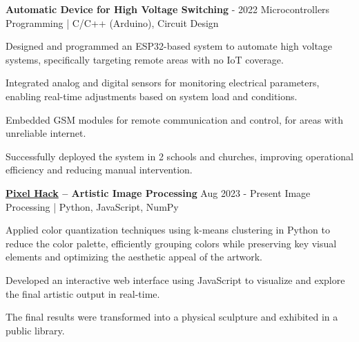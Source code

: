 \begin{rSection}
    \begin{rSubsection}
        {\bf Automatic Device for High Voltage Switching}
        { - 2022}
        {Microcontrollers Programming {\normalfont \small \ttfamily | C/C++ (Arduino), Circuit Design} }
        {}
        \item Designed and programmed an ESP32-based system to automate high voltage systems, specifically targeting remote areas with no IoT coverage.
        \item Integrated analog and digital sensors for monitoring electrical parameters, enabling real-time adjustments based on system load and conditions.
        \item Embedded GSM modules for remote communication and control, for areas with unreliable internet.
        \item Successfully deployed the system in 2 schools and churches, improving operational efficiency and reducing manual intervention.
    \end{rSubsection}


    \begin{rSubsection}
        {\bf \href{https://pixel-hack.vercel.app/}{Pixel Hack} – Artistic Image Processing}
        {\ttfamily Aug 2023 - Present}
        {Image Processing {\normalfont \small \ttfamily | Python, JavaScript, NumPy} }
        {}
        \item Applied color quantization techniques using k-means clustering in Python to reduce the color palette, efficiently grouping colors while preserving key visual elements and optimizing the aesthetic appeal of the artwork.
        \item Developed an interactive web interface using JavaScript to visualize and explore the final artistic output in real-time.
        \item The final results were transformed into a physical sculpture and exhibited in a public library.
    \end{rSubsection}
    

\end{rSection}
